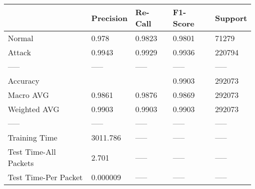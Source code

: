 \begin{tabular}{lllll}
\toprule
{} & Precision & Re-Call & F1-Score & Support \\
\midrule
Normal                &     0.978 &  0.9823 &   0.9801 &   71279 \\
Attack                &    0.9943 &  0.9929 &   0.9936 &  220794 \\
-----                 &     ----- &   ----- &    ----- &   ----- \\
Accuracy              &           &         &   0.9903 &  292073 \\
Macro AVG             &    0.9861 &  0.9876 &   0.9869 &  292073 \\
Weighted AVG          &    0.9903 &  0.9903 &   0.9903 &  292073 \\
-----                 &     ----- &   ----- &    ----- &   ----- \\
Training Time         &  3011.786 &   ----- &    ----- &   ----- \\
Test Time-All Packets &     2.701 &   ----- &    ----- &   ----- \\
Test Time-Per Packet  &  0.000009 &   ----- &    ----- &   ----- \\
\bottomrule
\end{tabular}
